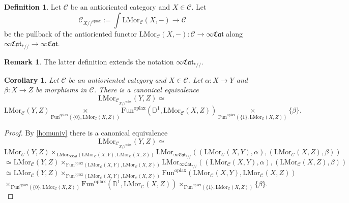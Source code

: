 \documentclass[10pt,oneside]{article}
\numberwithin{equation}{section} %
\numberwithin{figure}{section} %
\theoremstyle{plain}
\newtheorem{corollary}[theorem]{Corollary}
\theoremstyle{definition}
\newtheorem{definition}[theorem]{Definition}
\newtheorem{remark}[theorem]{Remark}
\newcommand{\bD}{{\mathbb D}}
\newcommand{\mC}{{\mathcal C}}
\renewcommand{\L}{{\mathrm L}}
\newcommand{\Fun}{\mathrm{Fun}}
\newcommand{\oplax}{{\mathrm{oplax}}}
\newcommand{\Mor}{{\mathrm{Mor}}}
\newcommand{\fcat}{\mathfrak{Cat}}
\begin{document}
\begin{definition}
Let $\mC$ be an antioriented category  and $X \in \mC$.
Let $$\mC_{X //^\oplax} := \int \L\Mor_\mC(X,-)\to \mC $$ be the pullback of the antioriented functor $\L\Mor_\mC(X,-): \mC \to \infty\fcat$
along $\infty\fcat_{*//} \to \infty\fcat$.  
\end{definition}

\begin{remark}
The latter definition extends the notation $\infty\fcat_{*//}.$
\end{remark}

\begin{corollary}
Let $\mC$ be an antioriented category  and $X \in \mC$.
Let $\alpha: X \to Y$ and $\beta: X \to Z $ be morphisms in $\mC$.
There is a canonical equivalence
$$ \L\Mor_{\mC_{X//^\oplax}}(Y, Z) \simeq $$$$ \L\Mor_\mC(Y,Z) \underset{\Fun^\oplax(\{0\},\L\Mor_\mC(X,Z))}{\times} \Fun^\oplax(\bD^1,\L\Mor_\mC(X,Z)) \underset{\Fun^\oplax(\{1\},\L\Mor_\mC(X,Z))}{\times} \{\beta\}.$$
\end{corollary}

\begin{proof}
By \cref{homuniv} there is a canonical equivalence
$$ \L\Mor_{\mC_{X//^\oplax}}(Y, Z) \simeq $$
$$\L\Mor_\mC(Y,Z) \times_{\L\Mor_{\infty\fcat}(\L\Mor_\mC(X,Y),\L\Mor_\mC(X,Z))}
\L\Mor_{\infty\fcat_{*//}}((\L\Mor_\mC(X,Y),\alpha),(\L\Mor_\mC(X,Z),\beta)) $$
$$ \simeq \L\Mor_\mC(Y,Z) \times_{\Fun^\oplax(\L\Mor_\mC(X,Y),\L\Mor_\mC(X,Z))}
\L\Mor_{\infty\fcat_{*//}}((\L\Mor_\mC(X,Y),\alpha),(\L\Mor_\mC(X,Z),\beta)) $$
$$\simeq \L\Mor_\mC(Y,Z) \times_{\Fun^\oplax(\L\Mor_\mC(X,Y),\L\Mor_\mC(X,Z))}
\Fun^\oplax(\L\Mor_\mC(X,Y),\L\Mor_\mC(X,Z)) $$$$ \times_{\Fun^\oplax(\{0\},\L\Mor_\mC(X,Z))} \Fun^\oplax(\bD^1,\L\Mor_\mC(X,Z)) \times_{\Fun^\oplax(\{1\},\L\Mor_\mC(X,Z))} \{\beta\}.$$
\end{proof}





\end{document}
